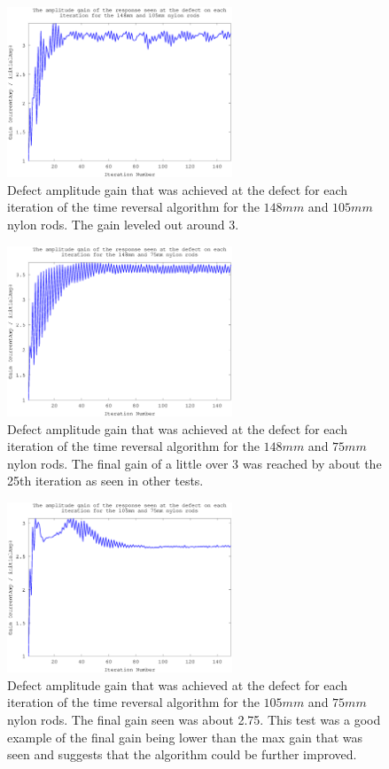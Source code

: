  \begin{figure}[ht!]
 \centering
 \includegraphics[width=0.6\textwidth]{eps_pics/nylon-2-3_iterationVsGain.eps}
 \caption{Defect amplitude gain that was achieved at the defect for each iteration of the time reversal algorithm for the $148mm$ and $105mm$ nylon rods. The gain leveled out around 3.
 	 \label{fig:nylonIter1}} 
 \end{figure}
   
 \begin{figure}[ht!]
 \centering
 \includegraphics[width=0.6\textwidth]{eps_pics/nylon-2-4_iterationVsGain.eps}
 \caption{Defect amplitude gain that was achieved at the defect for each iteration of the time reversal algorithm for the $148mm$ and $75mm$ nylon rods. The final gain of a little over 3 was reached by about the 25th iteration as seen in other tests.
  	 \label{fig:nylonIter2}} 
 \end{figure}
 
 \begin{figure}[ht!]
 \centering
 \includegraphics[width=0.6\textwidth]{eps_pics/nylon-3-4_iterationVsGain.eps}
 \caption{Defect amplitude gain that was achieved at the defect for each iteration of the time reversal algorithm for the $105mm$ and $75mm$ nylon rods. The final gain seen was about 2.75. This test was a good example of the final gain being lower than the max gain that was seen and suggests that the algorithm could be further improved.
  	 \label{fig:nylonIter3}} 
 \end{figure}
 
